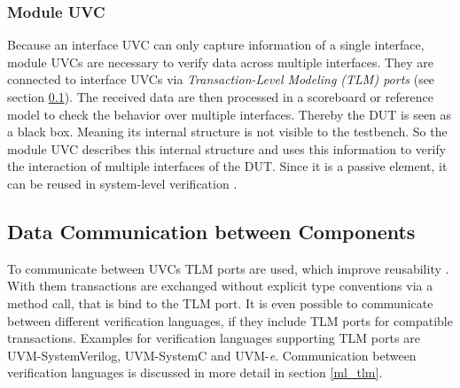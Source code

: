 \subsubsection{Module UVC}\label{module_uvc}

Because an interface UVC can only capture information of a single interface,
module UVCs are necessary to verify data across multiple interfaces. They are
connected to interface UVCs via \emph{Transaction-Level Modeling (TLM)
ports} (see section \ref{tlm}). The received data are then processed in a
scoreboard or reference model to check the behavior over multiple interfaces.
Thereby the DUT is seen as a black box. Meaning its internal structure is not
visible to the testbench. So the module UVC describes this internal structure
and uses this information to verify the interaction of multiple interfaces of
the DUT. Since it is a passive element, it can be reused in system-level
verification \cite{uvm}.

\subsection{Data Communication between Components}\label{tlm}

To communicate between UVCs TLM ports are used, which improve reusability \cite{uvm_sv}. With
them transactions are exchanged without explicit type conventions via a
method call, that is bind to the TLM port. It is even possible to communicate
between different verification languages, if they include TLM ports for
compatible transactions. Examples for verification languages supporting TLM ports are UVM-SystemVerilog, UVM-SystemC and
UVM-\textit{e}. Communication between verification languages is discussed in more
detail in section \ref{ml_tlm}.
